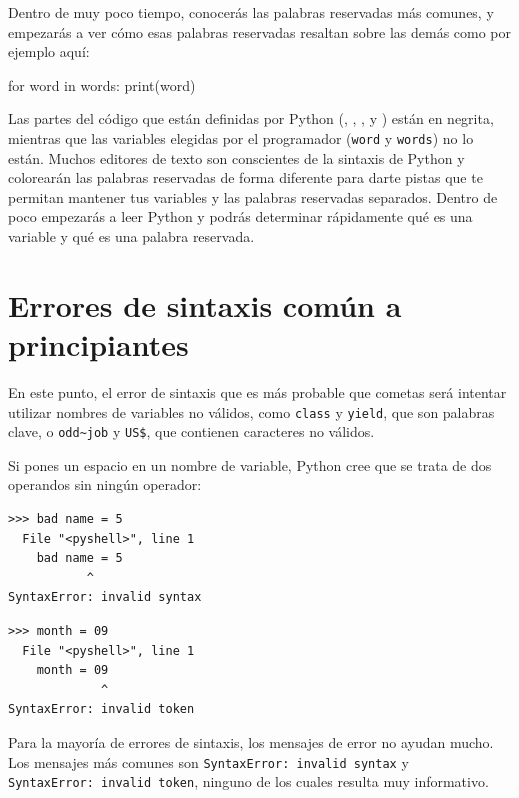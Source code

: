 Dentro de muy poco tiempo, conocerás las palabras reservadas más
comunes, y empezarás a ver cómo esas palabras reservadas resaltan sobre
las demás como por ejemplo aquí:

\begin{python}[frame=single]
for word in words:
    print(word)
\end{python}


Las partes del código que están definidas por Python 
(,
, 
, 
y \pythoninline{:}) están en negrita, mientras
que las variables elegidas por el programador (\texttt{word} y
\texttt{words}) no lo están. Muchos editores de texto son conscientes de
la sintaxis de Python y colorearán las palabras reservadas de forma
diferente para darte pistas que te permitan mantener tus variables y las
palabras reservadas separados. Dentro de poco empezarás a leer Python y
podrás determinar rápidamente qué es una variable y qué es una palabra
reservada.

\hypertarget{depuraciuxf3n}{%
\section{Errores de sintaxis común a principiantes}\label{depuraciuxf3n}}


En este punto, el error de sintaxis que es más probable que cometas será
intentar utilizar nombres de variables no válidos, como \texttt{class} y
\texttt{yield}, que son palabras clave, o
\texttt{odd\textasciitilde{}job} y \texttt{US\$}, que contienen
caracteres no válidos.

 

Si pones un espacio en un nombre de variable, Python cree que se trata
de dos operandos sin ningún operador:

\begin{Verbatim}[frame=single]
>>> bad name = 5
  File "<pyshell>", line 1
    bad name = 5
           ^
SyntaxError: invalid syntax
\end{Verbatim}

\begin{Verbatim}[frame=single]
>>> month = 09
  File "<pyshell>", line 1
    month = 09
             ^
SyntaxError: invalid token
\end{Verbatim}

Para la mayoría de errores de sintaxis, los mensajes de error no ayudan
mucho. Los mensajes más comunes son
\texttt{SyntaxError:\ invalid\ syntax} y
\texttt{SyntaxError:\ invalid\ token}, ninguno de los cuales resulta muy
informativo.

